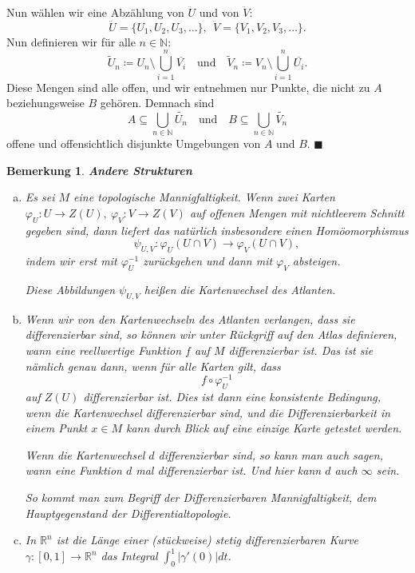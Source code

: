 \documentclass[12pt]{scrbook}   %
\newtheorem{bemX}[alles]{Bemerkung}
\newenvironment{bem}[1]{\begin{bemX}{\bf #1}\par\rm}{\end{bemX}}
\newcommand{\qed}{\phantom{.}\hfill{$\blacksquare$}}
\newcommand{\da}{\coloneqq}
\begin{document}
Nun w\"ahlen wir eine Abz\"ahlung von $\ddot U$ und von $\ddot V:$
$$\ddot U = \{U_1,U_2,U_3,\dots\},\ \ \ddot V=\{V_1,V_2,V_3,\dots\}.$$
Nun definieren wir f\"ur alle $n\in \mathbb N:$
$$\widetilde U_n \da U_n\setminus\bigcup_{i=1}^n \overline{V_i}\quad\text{und}\quad
\widetilde V_n \da V_n\setminus\bigcup_{i=1}^n \overline{U_i}.$$
Diese Mengen sind alle offen, und wir entnehmen nur Punkte, die nicht zu $A$ 
beziehungsweise $B$ geh\"oren. Demnach sind
$$A\subseteq \bigcup_{n\in \mathbb N}\widetilde{U_n}\quad\text{und}\quad 
B\subseteq \bigcup_{n\in \mathbb N}\widetilde{V_n}$$
offene und offensichtlich disjunkte Umgebungen von $A$ und $B$. 
\qed

\begin{bem}{Andere Strukturen}
\begin{enumerate}[a)]
\item Es sei $M$ eine topologische Mannigfaltigkeit. Wenn zwei Karten
$\varphi_U : U\longrightarrow Z(U), \ \varphi_V:V\longrightarrow Z(V)$
auf offenen Mengen mit nichtleerem Schnitt gegeben sind, dann liefert das
nat\"urlich insbesondere einen Hom\"oomorphismus
$$\psi_{U,V} : \varphi_U(U\cap V) \longrightarrow \varphi_V(U\cap V),$$
indem wir erst mit $\varphi_U^{-1}$ zur\"uckgehen und dann mit $\varphi_V$ 
absteigen.

Diese Abbildungen $\psi_{U,V}$ heißen die {\it Kartenwechsel} des Atlanten. 

\item Wenn wir von den Kartenwechseln des Atlanten verlangen, dass sie 
differenzierbar sind, so k\"onnen wir unter R\"uckgriff auf den Atlas 
definieren, wann eine reellwertige Funktion $f$ auf $M$ differenzierbar ist. 
Das ist sie nämlich genau dann, wenn f\"ur alle Karten gilt, dass
$$f\circ \varphi_U^{-1}$$ auf $Z(U)$ differenzierbar ist. Dies ist dann eine
konsistente Bedingung, wenn die Kartenwechsel differenzierbar sind, und die
Differenzierbarkeit in einem Punkt $x\in M$ kann durch Blick auf eine einzige
Karte getestet werden.

Wenn die Kartenwechsel $d$ differenzierbar sind, so kann man auch sagen, wann
eine Funktion $d$ mal differenzierbar ist. Und hier kann $d$ auch $\infty$ 
sein.

So kommt man zum Begriff der Differenzierbaren Mannigfaltigkeit, dem 
Hauptgegenstand der Differentialtopologie.

\item In $\mathbb R^n$ ist die Länge einer (stückweise) stetig differenzierbaren Kurve $\gamma:[0,1]\to \mathbb R^n$ das Integral $\int_0^1 |\gamma'(0)|dt$.


\end{enumerate}
\end{bem}
\end{document}
